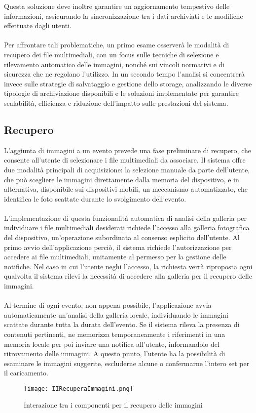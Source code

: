 Questa soluzione deve inoltre garantire un aggiornamento tempestivo delle informazioni, assicurando la sincronizzazione tra i dati archiviati e le modifiche effettuate dagli utenti.\\
\\
Per affrontare tali problematiche, un primo esame osserverà le modalità di recupero dei file multimediali,
con un focus sulle tecniche di selezione e rilevamento automatico delle immagini, nonché sui vincoli normativi e di sicurezza che ne regolano l’utilizzo.
In un secondo tempo l’analisi si concentrerà invece sulle strategie di salvataggio e gestione dello storage,
analizzando le diverse tipologie di archiviazione disponibili e le soluzioni implementate per garantire scalabilità, efficienza e riduzione dell’impatto sulle prestazioni del sistema.


\clearpage


\subsection{Recupero}

L’aggiunta di immagini a un evento prevede una fase preliminare di recupero, che consente all’utente di selezionare i file multimediali da associare. 
Il sistema offre due modalità principali di acquisizione: la selezione manuale da parte dell’utente, che può scegliere le immagini direttamente dalla memoria del dispositivo, 
e in alternativa, disponibile sui dispositivi mobili, un meccanismo automatizzato, che identifica le foto scattate durante lo svolgimento dell’evento.\\
\\
L’implementazione di questa funzionalità automatica di analisi della galleria per individuare i file multimediali desiderati  richiede l’accesso alla galleria fotografica del dispositivo, 
un’operazione subordinata al consenso esplicito dell’utente. 
Al primo avvio dell’applicazione perciò, il sistema richiede l’autorizzazione per accedere ai file multimediali, unitamente al permesso per la gestione delle notifiche. 
Nel caso in cui l’utente neghi l’accesso, la richiesta verrà riproposta ogni qualvolta il sistema rilevi la necessità di accedere alla galleria per il recupero delle immagini.\\
\\
Al termine di ogni evento, non appena possibile, l’applicazione avvia automaticamente un’analisi della galleria locale, individuando le immagini scattate durante tutta la durata dell’evento. 
Se il sistema rileva la presenza di contenuti pertinenti, ne memorizza temporaneamente i riferimenti in una memoria locale per poi inviare una notifica all’utente, 
informandolo del ritrovamento delle immagini. A questo punto, l’utente ha la possibilità di esaminare le immagini suggerite, escluderne alcune o confermarne l’intero set per il caricamento.\\
\clearpage
\begin{figure}[htb]
    \centering
    \texttt{[image: IIRecuperaImmagini.png]}
    \caption{Interazione tra i componenti per il recupero delle immagini}
\end{figure}

